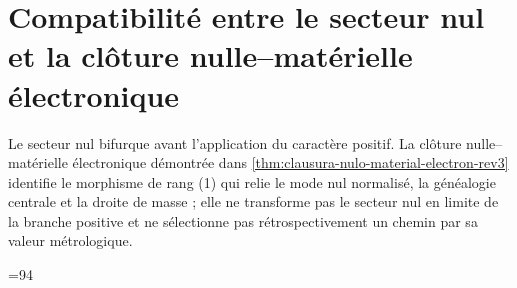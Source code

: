 

\section{Compatibilité entre le secteur nul et la clôture nulle--matérielle électronique}
Le secteur nul bifurque avant l'application du caractère positif. La
clôture nulle--matérielle électronique démontrée dans
\cref{thm:clausura-nulo-material-electron-rev3} identifie le morphisme de
rang (1) qui relie le mode nul normalisé, la généalogie centrale et la
droite de masse ; elle ne transforme pas le secteur nul en limite de la branche positive et ne
sélectionne pas rétrospectivement un chemin par sa valeur métrologique.





\makeatletter
\ifHMTPartIVElectronOwnersInserted\else
  \PackageError{hmt-sucesor-102}{Les propriétaires électroniques 06ka/06l n'ont pas été activés}{La Partie IV ne peut être clôturée sans leurs corps intégraux.}%
\fi
\ifnum\value{chapter}=94\relax
\else
  \PackageError{hmt-sucesor-102}{La Partie IV ne se termine pas au chapitre 94}{Vérifiez la correspondance 56--90 vers 58--92, 93 nouveau et 91 vers 94.}%
\fi
\let\chapter\HMTPartIVPublicChapter
\makeatother










\HMTFlushCurrentChapter
